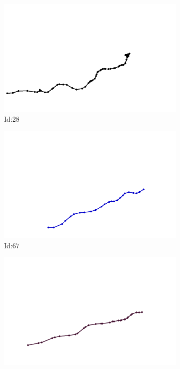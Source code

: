 \documentclass[12pt,twoside]{report}
\begin{document}
\begin{figure}
\centering
\begin{subfigure}[b]{0.20\textwidth}
\centering
\includegraphics[width=\textwidth]{../../trajectories/28.png}
\caption{Id:28}
\end{subfigure}
\begin{subfigure}[b]{0.20\textwidth}
\centering
\includegraphics[width=\textwidth]{../../trajectories/67.png}
\caption{Id:67}
\end{subfigure}
\begin{subfigure}[b]{0.20\textwidth}
\centering
\includegraphics[width=\textwidth]{../../trajectories/358.png}

\end{subfigure}
\end{figure}
\end{document}

